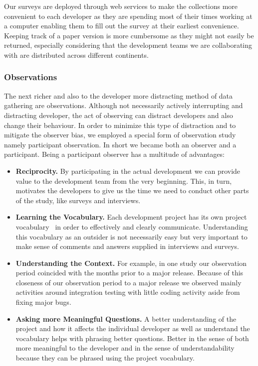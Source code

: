 Our surveys are deployed through web services to make the collections more convenient to each developer as they are spending most of their times working at a computer enabling them to fill out the survey at their earliest convenience.
Keeping track of a paper version is more cumbersome as they might not easily be returned, especially considering that the development teams we are collaborating with are distributed across different continents.


\subsubsection{Observations}
The next richer and also to the developer more distracting method of data gathering are observations.
Although not necessarily actively interrupting and distracting developer, the act of observing can distract developers and also change their behaviour.
In order to minimize this type of distraction and to mitigate the observer bias, we employed a special form of observation study namely participant observation.
In short we became both an observer and a participant.
%
Being a participant observer has a multitude of advantages:

\begin{itemize}
\item\textbf{Reciprocity.} By participating in the actual development we can provide value to the development team from the very beginning.
This, in turn, motivates the developers to give us the time we need to conduct other parts of the study, like surveys and interviews.
\item\textbf{Learning the Vocabulary.} Each development project has its own project vocabulary~\cite{espinosa2007:team_knowledge} in order to effectively and clearly communicate. 
Understanding this vocabulary as an outsider is not necessarily easy but very important to make sense of comments and answers supplied in interviews and surveys.
\item\textbf{Understanding the Context.} For example, in one study our observation period coincided with the months prior to a major release. 
Because of this closeness of our observation period to a major release we observed mainly activities around integration testing with little coding activity aside from fixing major bugs.


\item\textbf{Asking more Meaningful Questions.} A better understanding of the project and how it affects the individual developer as well as understand the vocabulary helps with phrasing better questions.
Better in the sense of both more meaningful to the developer and in the sense of understandability because they can be phrased using the project vocabulary.
\end{itemize}

